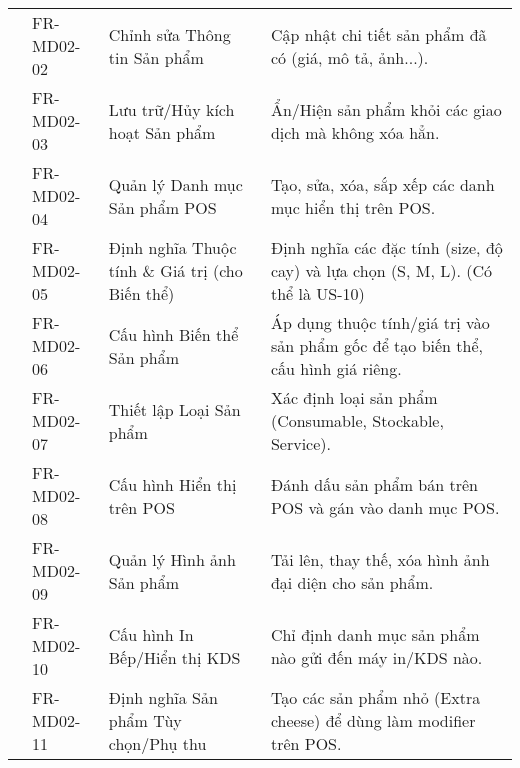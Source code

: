 \begin{longtable}{|m{2.5cm}|m{2.5cm}|m{5cm}|m{5cm}|}
	                                                        & FR-MD02-02            & Chỉnh sửa Thông tin Sản phẩm                           & Cập nhật chi tiết sản phẩm đã có (giá, mô tả, ảnh...).                                      \\
	                                                        & FR-MD02-03            & Lưu trữ/Hủy kích hoạt Sản phẩm                         & Ẩn/Hiện sản phẩm khỏi các giao dịch mà không xóa hẳn.                                       \\
	                                                        & FR-MD02-04            & Quản lý Danh mục Sản phẩm POS                          & Tạo, sửa, xóa, sắp xếp các danh mục hiển thị trên POS.                                      \\
	                                                        & FR-MD02-05            & Định nghĩa Thuộc tính \& Giá trị (cho Biến thể)        & Định nghĩa các đặc tính (size, độ cay) và lựa chọn (S, M, L). (Có thể là US-10)             \\
	                                                        & FR-MD02-06            & Cấu hình Biến thể Sản phẩm                             & Áp dụng thuộc tính/giá trị vào sản phẩm gốc để tạo biến thể, cấu hình giá riêng.            \\
	                                                        & FR-MD02-07            & Thiết lập Loại Sản phẩm                                & Xác định loại sản phẩm (Consumable, Stockable, Service).                                    \\
	                                                        & FR-MD02-08            & Cấu hình Hiển thị trên POS                             & Đánh dấu sản phẩm bán trên POS và gán vào danh mục POS.                                     \\
	                                                        & FR-MD02-09            & Quản lý Hình ảnh Sản phẩm                              & Tải lên, thay thế, xóa hình ảnh đại diện cho sản phẩm.                                      \\
	                                                        & FR-MD02-10            & Cấu hình In Bếp/Hiển thị KDS                           & Chỉ định danh mục sản phẩm nào gửi đến máy in/KDS nào.                                      \\
	                                                        & FR-MD02-11            & Định nghĩa Sản phẩm Tùy chọn/Phụ thu                   & Tạo các sản phẩm nhỏ (Extra cheese) để dùng làm modifier trên POS.                          \\ \cline{2-4}

\end{longtable}

